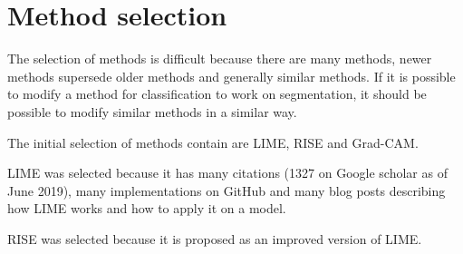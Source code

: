 \section{Method selection}
The selection of methods is difficult because there are many methods, newer methods supersede older methods and generally similar methods.
If it is possible to modify a method for classification to work on segmentation, it should be possible to modify similar methods in a similar way.

The initial selection of methods contain are LIME, RISE and Grad-CAM.

LIME was selected because it has many citations (1327 on Google scholar as of June 2019), many implementations on GitHub and many blog posts describing how LIME works and how to apply it on a model.

RISE was selected because it is proposed as an improved version of LIME. 